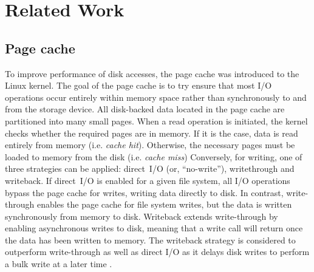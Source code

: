 \documentclass[conference]{IEEEtran}
\begin{document}
    \section{Related Work}
    \label{relatedwork}
        
        \subsection{Page cache}
            
        To improve performance of disk accesses, the page cache was introduced to the Linux kernel. %
            The goal of the page cache is to try ensure that most I/O operations occur entirely
            within memory space rather than synchronously to and from the storage device.
            All disk-backed data located in the page cache are partitioned into many small pages.
            When a read operation is initiated, the kernel checks whether the required pages are in memory.
            If it is the case, data is read entirely from memory (i.e. \textit{cache hit}). Otherwise,
            the necessary pages must be loaded to memory from the disk (i.e. \textit{cache miss})
            Conversely, for writing, one of three strategies can be applied: direct~I/O (or, ``no-write''),
            writethrough and writeback.
            If direct~I/O is enabled for a given file system, all I/O operations bypass the
            page cache for writes, writing data directly to disk. In contrast, write-through enables the page cache
            for file system writes, but the data is written synchronously from memory to disk. Writeback extends write-through
            by enabling asynchronous writes to disk, meaning that a write call will return once
            the data has been written to memory.
            The writeback strategy is considered to outperform write-through as well as 
            direct I/O as it delays disk writes to perform a bulk write at a later time
            \cite{linuxdev3rd2010}. 
            
\end{document}
